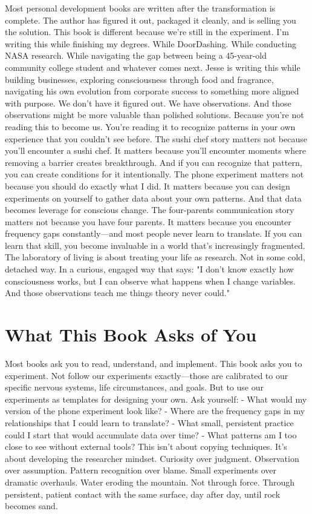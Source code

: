 Most personal development books are written after the transformation is complete. The author has figured it out, packaged it cleanly, and is selling you the solution.
This book is different because we're still in the experiment.
I'm writing this while finishing my degrees. While DoorDashing. While conducting NASA research. While navigating the gap between being a 45-year-old community college student and whatever comes next.
Jesse is writing this while building businesses, exploring consciousness through food and fragrance, navigating his own evolution from corporate success to something more aligned with purpose.
We don't have it figured out. We have observations.
And those observations might be more valuable than polished solutions. Because you're not reading this to become us. You're reading it to recognize patterns in your own experience that you couldn't see before.
The sushi chef story matters not because you'll encounter a sushi chef. It matters because you'll encounter moments where removing a barrier creates breakthrough. And if you can recognize that pattern, you can create conditions for it intentionally.
The phone experiment matters not because you should do exactly what I did. It matters because you can design experiments on yourself to gather data about your own patterns. And that data becomes leverage for conscious change.
The four-parents communication story matters not because you have four parents. It matters because you encounter frequency gaps constantly—and most people never learn to translate. If you can learn that skill, you become invaluable in a world that's increasingly fragmented.
The laboratory of living is about treating your life as research.
Not in some cold, detached way. In a curious, engaged way that says: "I don't know exactly how consciousness works, but I can observe what happens when I change variables. And those observations teach me things theory never could."

\section{What This Book Asks of You}

Most books ask you to read, understand, and implement.
This book asks you to experiment.
Not follow our experiments exactly—those are calibrated to our specific nervous systems, life circumstances, and goals. But to use our experiments as templates for designing your own.
Ask yourself:
- What would my version of the phone experiment look like?
- Where are the frequency gaps in my relationships that I could learn to translate?
- What small, persistent practice could I start that would accumulate data over time?
- What patterns am I too close to see without external tools?
This isn't about copying techniques. It's about developing the researcher mindset.
Curiosity over judgment. Observation over assumption. Pattern recognition over blame. Small experiments over dramatic overhauls.
Water eroding the mountain.
Not through force. Through persistent, patient contact with the same surface, day after day, until rock becomes sand.

